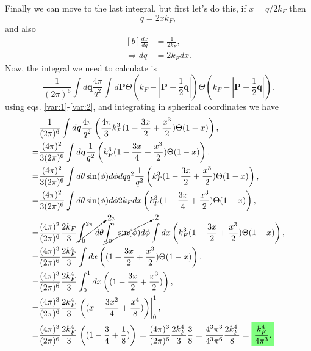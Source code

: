 \begin{questions}
\begin{solution}
Finally we can move to the last integral, but first let's do this, if $x = q/2k_F$ then
\begin{equation}
  q = 2xk_F,
  \label{var:1}
\end{equation}
and also
\begin{equation}
  \begin{aligned}[b]
    \frac{dx}{dq} &= \frac{1}{2k_F},\\
    \Rightarrow dq &= 2k_Fdx.
  \end{aligned}
  \label{var:2}
\end{equation}
Now, the integral we need to calculate is
\begin{equation*}
  \frac{1}{(2\pi)^6}\int d\bm{q}\frac{4\pi}{q^2}\int d\bm{P}\Theta(k_F - |\bm{P} +\frac{1}{2}\bm{q}|)\Theta(k_F - |\bm{P} -\frac{1}{2}\bm{q}|).
\end{equation*}
using eqs. \ref{var:1}-\ref{var:2}, and integrating in spherical coordinates we have
\begin{equation*}
  \begin{aligned}[b]
  &\frac{1}{(2\pi)^6}\int d\bm{q}\frac{4\pi}{q^2}\left(\frac{4\pi}{3}k_F^3(1 - \frac{3x}{2}+\frac{x^3}{2})\Theta(1-x)\right),\\
  =& \frac{(4\pi)^2}{3(2\pi)^6}\int d\bm{q}\frac{1}{q^2}\left(k_F^3(1 - \frac{3x}{4}+\frac{x^3}{2})\Theta(1-x)\right),\\
  =& \frac{(4\pi)^2}{3(2\pi)^6}\int d\theta \sin(\phi)d\phi dq q^2\frac{1}{q^2}\left(k_F^3(1 - \frac{3x}{2}+\frac{x^3}{2})\Theta(1-x)\right), \\
  =& \frac{(4\pi)^2}{3(2\pi)^6}\int d\theta \sin(\phi)d\phi 2k_Fdx \left(k_F^3(1 - \frac{3x}{4}+\frac{x^3}{2})\Theta(1-x)\right),\\
  =& \frac{(4\pi)^2}{(2\pi)^6}\frac{2k_F}{3}\cancelto{2\pi}{\int_0^{2\pi} d\theta} \cancelto{2}{\int_0^\pi \sin(\phi)d\phi} \int dx \left(k_F^3(1 - \frac{3x}{2}+\frac{x^3}{2})\Theta(1-x)\right),\\
  =& \frac{(4\pi)^3}{(2\pi)^6}\frac{2k_F^4}{3} \int dx \left((1 - \frac{3x}{2}+\frac{x^3}{2})\Theta(1-x)\right),\\
  =& \frac{(4\pi)^3}{(2\pi)^6}\frac{2k_F^4}{3} \int_0^1 dx \left((1 - \frac{3x}{2}+\frac{x^3}{2})\right),\\
  =& \frac{(4\pi)^3}{(2\pi)^6}\frac{2k_F^4}{3}  \left.\left((x - \frac{3x^2}{4}+\frac{x^4}{8})\right)\right|_0^1,\\
  =& \frac{(4\pi)^3}{(2\pi)^6}\frac{2k_F^4}{3}  \left.\left((1 - \frac{3}{4}+\frac{1}{8})\right)\right. = \frac{(4\pi)^3}{(2\pi)^6}\frac{2k_F^4}{3} \frac{3}{8} = \frac{4^3\pi^3}{4^3\pi^6}\frac{2k_F^4}{8} =  \hlgreen{\frac{k_F^4}{4\pi^3}.}
\end{aligned}
\end{equation*}
\end{solution}
\end{questions}


%
%

